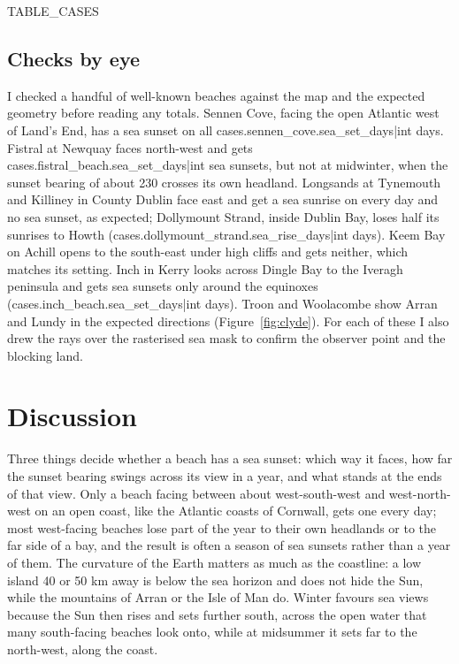 \documentclass[11pt,a4paper]{article}
\begin{document}
{{TABLE_CASES}}


\subsection{Checks by eye}
I checked a handful of well-known beaches against the map and the expected geometry before reading any totals. Sennen Cove, facing the open Atlantic west of Land's End, has a sea sunset on all {{cases.sennen_cove.sea_set_days|int}} days. Fistral at Newquay faces north-west and gets {{cases.fistral_beach.sea_set_days|int}} sea sunsets, but not at midwinter, when the sunset bearing of about 230\textdegree{} crosses its own headland. Longsands at Tynemouth and Killiney in County Dublin face east and get a sea sunrise on every day and no sea sunset, as expected; Dollymount Strand, inside Dublin Bay, loses half its sunrises to Howth ({{cases.dollymount_strand.sea_rise_days|int}} days). Keem Bay on Achill opens to the south-east under high cliffs and gets neither, which matches its setting. Inch in Kerry looks across Dingle Bay to the Iveragh peninsula and gets sea sunsets only around the equinoxes ({{cases.inch_beach.sea_set_days|int}} days). Troon and Woolacombe show Arran and Lundy in the expected directions (Figure~\ref{fig:clyde}). For each of these I also drew the rays over the rasterised sea mask to confirm the observer point and the blocking land.

\section{Discussion}
Three things decide whether a beach has a sea sunset: which way it faces, how far the sunset bearing swings across its view in a year, and what stands at the ends of that view. Only a beach facing between about west-south-west and west-north-west on an open coast, like the Atlantic coasts of Cornwall, gets one every day; most west-facing beaches lose part of the year to their own headlands or to the far side of a bay, and the result is often a season of sea sunsets rather than a year of them. The curvature of the Earth matters as much as the coastline: a low island 40 or 50 km away is below the sea horizon and does not hide the Sun, while the mountains of Arran or the Isle of Man do. Winter favours sea views because the Sun then rises and sets further south, across the open water that many south-facing beaches look onto, while at midsummer it sets far to the north-west, along the coast.
\end{document}
